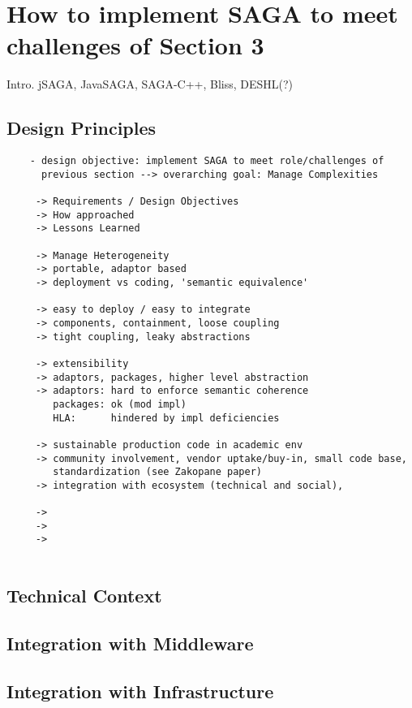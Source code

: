 \documentclass[a4paper,10pt]{article}
\begin{document}
\section{How to implement SAGA to meet challenges of Section 3}
\label{saga_impls}

 Intro. jSAGA, JavaSAGA, SAGA-C++, Bliss, DESHL(?)

 \subsection{Design Principles}

  \begin{verbatim}
    - design objective: implement SAGA to meet role/challenges of
      previous section --> overarching goal: Manage Complexities
  
     -> Requirements / Design Objectives
     -> How approached
     -> Lessons Learned
  
     -> Manage Heterogeneity
     -> portable, adaptor based
     -> deployment vs coding, 'semantic equivalence'
  
     -> easy to deploy / easy to integrate
     -> components, containment, loose coupling
     -> tight coupling, leaky abstractions
  
     -> extensibility
     -> adaptors, packages, higher level abstraction
     -> adaptors: hard to enforce semantic coherence
        packages: ok (mod impl)
        HLA:      hindered by impl deficiencies
  
     -> sustainable production code in academic env
     -> community involvement, vendor uptake/buy-in, small code base,
        standardization (see Zakopane paper)
     -> integration with ecosystem (technical and social), 
  
     ->
     -> 
     ->
  
  \end{verbatim}

\subsection{Technical Context}

\subsection{Integration with Middleware}

\subsection{Integration with Infrastructure}
\end{document}
